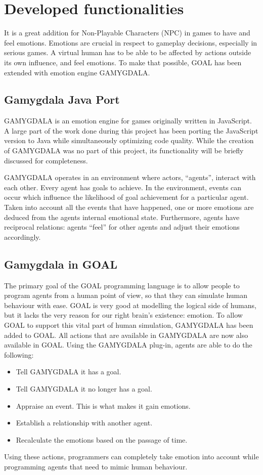 \section{Developed functionalities}
It is a great addition for Non-Playable Characters (NPC) in games to have and feel emotions. Emotions are crucial in respect to gameplay decisions, especially in serious games. A virtual human has to be able to be affected by actions outside its own influence, and feel emotions. To make that possible, GOAL has been extended with emotion engine GAMYGDALA.

\subsection{Gamygdala Java Port}
GAMYGDALA is an emotion engine for games originally written in JavaScript. A large part of the work done during this project has been porting the JavaScript version to Java while simultaneously optimizing code quality. While the creation of GAMYGDALA was no part of this project, its functionality will be briefly discussed for completeness.

GAMYGDALA operates in an environment where actors, ``agents'', interact with each other. Every agent has goals to achieve. In the environment, events can occur which influence the likelihood of goal achievement for a particular agent. Taken into account all the events that have happened, one or more emotions are deduced from the agents internal emotional state. Furthermore, agents have reciprocal relations: agents ``feel'' for other agents and adjust their emotions accordingly.

\subsection{Gamygdala in GOAL}
The primary goal of the GOAL programming language is to allow people to program agents from a human point of view, so that they can simulate human behaviour with ease. GOAL is very good at modelling the logical side of humans, but it lacks the very reason for our right brain's existence: emotion. To allow GOAL to support this vital part of human simulation, GAMYGDALA has been added to GOAL. All actions that are available in GAMYGDALA are now also available in GOAL. Using the GAMYGDALA plug-in, agents are able to do the following:
\begin{itemize}
	\item Tell GAMYGDALA it has a goal.
	\item Tell GAMYGDALA it no longer has a goal.
	\item Appraise an event. This is what makes it gain emotions.
	\item Establish a relationship with another agent.
	\item Recalculate the emotions based on the passage of time.
\end{itemize}
Using these actions, programmers can completely take emotion into account while programming agents that need to mimic human behaviour.